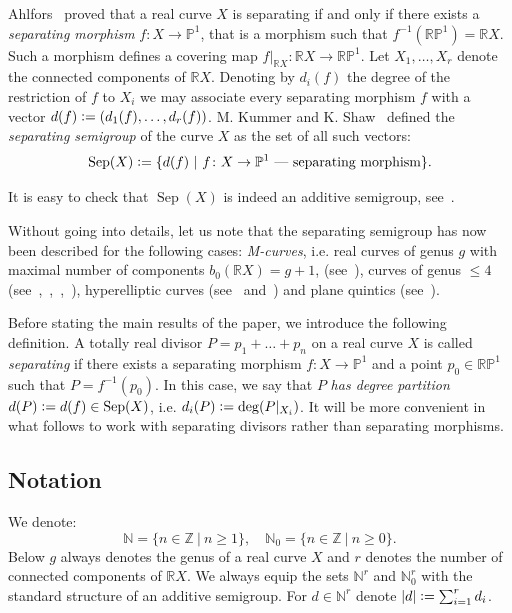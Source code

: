 \documentclass[x11names,oneside,11pt]{amsart}
\theoremstyle{definition}
\theoremstyle{remark}
\DeclareMathOperator{\Sep}{Sep}
\newcommand{\eqdef}{\vcentcolon=}
\newcommand{\N}{\mathbb{N}}
\newcommand{\Z}{\mathbb{Z}}
\newcommand{\R}{\mathbb{R}}
\newcommand{\PP}{\mathbb{P}}
\begin{document}
  Ahlfors~\cite{ahlfors_open_1950} proved that a real curve $X$ is separating if and only if there exists a \emph{separating morphism} $f\colon X \to \PP^1$, that is a morphism such that $f^{-1}(\R \PP^1)= \R X$. Such a morphism defines a covering map $f\vert_{\R X}\colon \R X \to \R \PP^1$. Let $X_1, \ldots, X_{r}$ denote the connected components of $\R X$. Denoting by $d_i(f)$ the degree of the restriction of $f$ to $X_i$ we may associate every separating morphism $f$ with a vector $d(f) \eqdef (d_1(f), \ldots, d_r(f))$. M. Kummer and K. Shaw~\cite{kummer_separating_2020} defined the \emph{separating semigroup} of the curve $X$ as the set of all such vectors:
  \[
    \Sep(X) \eqdef \{ d(f) \ \vert \ f\colon X \to \PP^1 \text{~--- separating morphism}\}. 
  \] 
  
  It is easy to check that $\Sep(X)$ is indeed an additive semigroup, see~\cite[Prop. 2.1]{kummer_separating_2020}. 
  
  Without going into details, let us note that   the separating semigroup has now been described for the following cases: \emph{M-curves}, i.e. real curves of genus $g$ with maximal number of components $b_0(\R X) = g+1$, (see~\cite[Theorem 1.7]{kummer_separating_2020}), curves of genus $\leqslant 4$ (see~\cite[Theorem 1.7]{kummer_separating_2020},~\cite{orevkov_separating_2019},~\cite[Example 3.3]{orevkov_algebraically_2021},~\cite{orevkov_separating_2025}), hyperelliptic curves (see~\cite{orevkov_separating_2019} and~\cite[\S 4]{orevkov_separating_2025}) and plane quintics (see~\cite{magin_orevkov_2025}). 

  \medskip


  Before stating the main results of the paper, we introduce the following definition. A totally real divisor $P = p_1 + \ldots + p_n$ on a real curve $X$ is called {\em separating} if there exists a separating morphism $f\colon X \to \PP^1$ and a point $p_0 \in \R \PP^1$ such that $P = f^{-1}(p_0)$. In this case, we say that $P$ {\em has degree partition} $d(P) \eqdef d(f) \in \Sep(X)$, i.e. $d_i(P) \eqdef \deg(P\vert_{X_i})$. It will be more convenient in what follows to work with separating divisors rather than separating morphisms.
  
    
  \subsection*{Notation} We denote:
  \[
      \N = \{ n \in \Z \ \vert \ n \geqslant 1 \}, \quad \N_0 = \{ n \in \Z \ \vert \ n \geqslant 0 \}.
  \] 
  Below $g$ always denotes the genus of a real curve $X$ and $r$ denotes the number of connected components of $\R X$. We always equip the sets $\N^r$ and $\N_0^{r}$ with the standard structure of an additive semigroup. For $d \in \N^{r}$ denote $|d|\eqdef \sum_{i=1}^{r}d_i$. 
  
\end{document}
